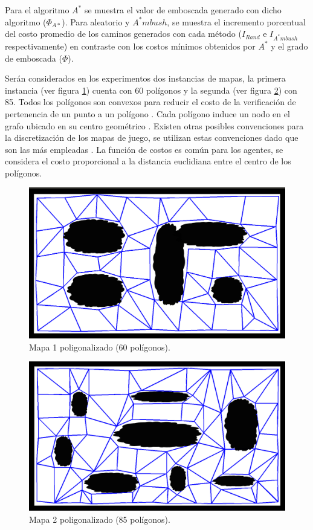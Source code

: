 \documentclass{egpubl}
\begin{document}
Para el algoritmo $A^*$ se muestra el valor de emboscada
generado con dicho algoritmo ($\Phi_{A*}$). Para aleatorio
y $A^*mbush$, se muestra el incremento porcentual del costo
promedio de los caminos generados con cada método
($I_{Rand}$ e $I_{A^*mbush}$
respectivamente) en contraste con los costos
mínimos obtenidos por $A^*$ y el grado de emboscada ($\Phi$).

Serán considerados en los experimentos dos instancias de
mapas, la primera instancia (ver figura \ref{fig:g2}) cuenta con
60 polígonos y la segunda (ver figura \ref{fig:g1}) con 85. Todos los
polígonos son convexos para reducir el costo de la verificación
de pertenencia de un punto a un polígono \cite{Hai01}. Cada polígono
induce un nodo en el grafo ubicado en su centro geométrico \cite{MF09}.
Existen otras posibles convenciones para la discretización de los mapas
de juego, se utilizan estas convenciones dado que son las más
empleadas \cite{MF09}.
La función de costos es común para los agentes, se considera el costo
proporcional a la distancia euclidiana entre el centro de los
polígonos.

\begin{figure}[htb]
	\begin{center}
		\includegraphics[scale=0.23]{g2.png}
	\end{center}
	\caption{\label{fig:g2}
	     Mapa 1 poligonalizado (60 polígonos).}
\end{figure}


\begin{figure}[htb]
	\begin{center}
		\includegraphics[scale=0.23]{g1.png}
	\end{center}
	\caption{\label{fig:g1}
	     Mapa 2 poligonalizado (85 polígonos).}
\end{figure}
\end{document}
